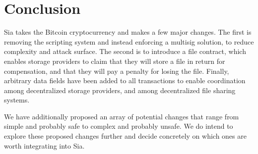 \documentclass[twocolumn]{article}
\begin{document}

\section{Conclusion}
Sia takes the Bitcoin cryptocurrency and makes a few major changes.
The first is removing the scripting system and instead enforcing a multisig solution, to reduce complexity and attack surface.
The second is to introduce a file contract, which enables storage providers to claim that they will store a file in return for compensation, and that they will pay a penalty for losing the file.
Finally, arbitrary data fields have been added to all transactions to enable coordination among decentralized storage providers, and among decentralized file sharing systems.

We have additionally proposed an array of potential changes that range from simple and probably safe to complex and probably unsafe.
We do intend to explore these proposed changes further and decide concretely on which ones are worth integrating into Sia.
\end{document}

